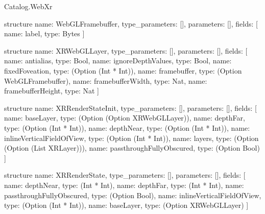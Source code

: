 \begin{lexlean}{Catalog.WebXr}
\begin{semanticmodule}
structure{
  name: WebGLFramebuffer,
  type_parameters: [],
  parameters: [],
  fields: [
    {name: label, type: Bytes}
  ]
}

structure{
  name: XRWebGLLayer,
  type_parameters: [],
  parameters: [],
  fields: [
    {name: antialias, type: Bool},
    {name: ignoreDepthValues, type: Bool},
    {name: fixedFoveation, type: (Option (Int * Int))},
    {name: framebuffer, type: (Option WebGLFramebuffer)},
    {name: framebufferWidth, type: Nat},
    {name: framebufferHeight, type: Nat}
  ]
}

structure{
  name: XRRenderStateInit,
  type_parameters: [],
  parameters: [],
  fields: [
    {name: baseLayer, type: (Option (Option XRWebGLLayer))},
    {name: depthFar, type: (Option (Int * Int))},
    {name: depthNear, type: (Option (Int * Int))},
    {name: inlineVerticalFieldOfView, type: (Option (Int * Int))},
    {name: layers, type: (Option (Option (List XRLayer)))},
    {name: passthroughFullyObscured, type: (Option Bool)}
  ]
}

structure{
  name: XRRenderState,
  type_parameters: [],
  parameters: [],
  fields: [
    {name: depthNear, type: (Int * Int)},
    {name: depthFar, type: (Int * Int)},
    {name: passthroughFullyObscured, type: (Option Bool)},
    {name: inlineVerticalFieldOfView, type: (Option (Int * Int))},
    {name: baseLayer, type: (Option XRWebGLLayer)}
  ]
}
\end{semanticmodule}
\end{lexlean}

